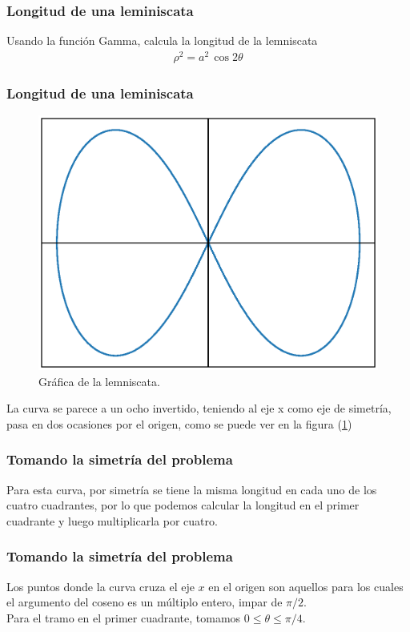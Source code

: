 \documentclass[12pt]{beamer}
\begin{document}
\begin{frame}
\frametitle{Longitud de una leminiscata}
Usando la función Gamma, calcula la longitud de la lemniscata
\begin{align*}
\rho^{2} = a^{2} \, \cos 2 \theta
\end{align*}
\end{frame}
\begin{frame}
\frametitle{Longitud de una leminiscata}
\begin{figure}
    \centering
    \includegraphics[scale=0.35]{Imagenes/plot_leminscata_01.eps}
    \caption{Gráfica de la lemniscata.}
    \label{fig:figura_lemniscata}
\end{figure}
La curva se parece a un ocho invertido, teniendo al eje x como eje de simetría, pasa en dos ocasiones por el origen, como se puede ver en la figura (\ref{fig:figura_lemniscata})
\end{frame}
\begin{frame}
\frametitle{Tomando la simetría del problema}
Para esta curva, por simetría se tiene la misma longitud en cada uno de los cuatro cuadrantes, por lo que podemos calcular la longitud en el primer cuadrante y luego multiplicarla por cuatro.
\end{frame}
\begin{frame}
\frametitle{Tomando la simetría del problema}
Los puntos donde la curva cruza el eje $x$ en el origen son aquellos para los cuales el argumento del coseno es un múltiplo entero, impar de $\pi / 2$. 
\\
\bigskip
Para el tramo en el primer cuadrante, tomamos $0 \leq \theta \leq \pi/4$.
\end{frame}
\end{document}
